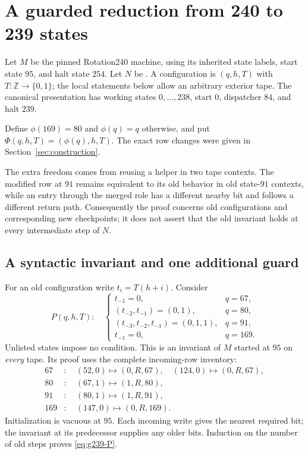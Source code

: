 \section{A guarded reduction from 240 to 239 states}
\label{sec:guarded-local-239}

Let $M$ be the pinned Rotation240 machine, using its inherited state
labels, start state $95$, and halt state $254$.  Let $N$ be
.  A configuration is $(q,h,T)$ with
$T:\mathbb Z\to\{0,1\}$; the local statements below allow an arbitrary
exterior tape.  The canonical presentation
 has working states $0,\ldots,238$, start $0$,
dispatcher $84$, and halt $239$.

Define $\phi(169)=80$ and $\phi(q)=q$ otherwise, and put
$\Phi(q,h,T)=(\phi(q),h,T)$. The exact row changes were given in
Section~\ref{sec:construction}.

The extra freedom comes from reusing a helper in two tape contexts.
The modified row at $91$ remains equivalent to its old behavior in
old state-$91$ contexts, while an entry through the merged role has a
different nearby bit and follows a different return path.  Consequently
the proof concerns old configurations and corresponding new
checkpoints; it does not assert that the old invariant holds at every
intermediate step of $N$.

\subsection{A syntactic invariant and one additional guard}

For an old configuration write $t_i=T(h+i)$.  Consider
\begin{equation}
\label{eq:g239-P}
P(q,h,T):\quad
\begin{cases}
t_{-1}=0,&q=67,\\
(t_{-2},t_{-1})=(0,1),&q=80,\\
(t_{-3},t_{-2},t_{-1})=(0,1,1),&q=91,\\
t_{-1}=0,&q=169.
\end{cases}
\end{equation}
Unlisted states impose no condition.  This is an invariant of $M$
started at $95$ on \emph{every} tape.  Its proof uses the complete
incoming-row inventory:
\begin{align*}
67&:\quad (52,0)\mapsto(0,R,67),\quad (124,0)\mapsto(0,R,67),\\
80&:\quad (67,1)\mapsto(1,R,80),\\
91&:\quad (80,1)\mapsto(1,R,91),\\
169&:\quad (147,0)\mapsto(0,R,169).
\end{align*}
Initialization is vacuous at $95$.  Each incoming write gives the
nearest required bit; the invariant at its predecessor supplies any
older bits.  Induction on the number of old steps proves
\eqref{eq:g239-P}.

